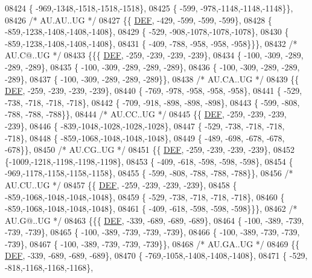 \begin{DoxyCode}
08424 \{ -969,-1348,-1518,-1518,-1518\},
08425 \{ -599, -978,-1148,-1148,-1148\}\},
08426 \textcolor{comment}{/* AU.AU..UG */}
08427 \{\{  \mbox{\hyperlink{1_88_84__epars_8h_a397419fc12b37ed479c8abb9d444d843}{DEF}}, -429, -599, -599, -599\},
08428 \{ -859,-1238,-1408,-1408,-1408\},
08429 \{ -529, -908,-1078,-1078,-1078\},
08430 \{ -859,-1238,-1408,-1408,-1408\},
08431 \{ -409, -788, -958, -958, -958\}\}\},
08432 \textcolor{comment}{/* AU.C@..UG */}
08433 \{\{\{  \mbox{\hyperlink{1_88_84__epars_8h_a397419fc12b37ed479c8abb9d444d843}{DEF}}, -259, -239, -239, -239\},
08434 \{ -100, -309, -289, -289, -289\},
08435 \{ -100, -309, -289, -289, -289\},
08436 \{ -100, -309, -289, -289, -289\},
08437 \{ -100, -309, -289, -289, -289\}\},
08438 \textcolor{comment}{/* AU.CA..UG */}
08439 \{\{  \mbox{\hyperlink{1_88_84__epars_8h_a397419fc12b37ed479c8abb9d444d843}{DEF}}, -259, -239, -239, -239\},
08440 \{ -769, -978, -958, -958, -958\},
08441 \{ -529, -738, -718, -718, -718\},
08442 \{ -709, -918, -898, -898, -898\},
08443 \{ -599, -808, -788, -788, -788\}\},
08444 \textcolor{comment}{/* AU.CC..UG */}
08445 \{\{  \mbox{\hyperlink{1_88_84__epars_8h_a397419fc12b37ed479c8abb9d444d843}{DEF}}, -259, -239, -239, -239\},
08446 \{ -839,-1048,-1028,-1028,-1028\},
08447 \{ -529, -738, -718, -718, -718\},
08448 \{ -859,-1068,-1048,-1048,-1048\},
08449 \{ -489, -698, -678, -678, -678\}\},
08450 \textcolor{comment}{/* AU.CG..UG */}
08451 \{\{  \mbox{\hyperlink{1_88_84__epars_8h_a397419fc12b37ed479c8abb9d444d843}{DEF}}, -259, -239, -239, -239\},
08452 \{-1009,-1218,-1198,-1198,-1198\},
08453 \{ -409, -618, -598, -598, -598\},
08454 \{ -969,-1178,-1158,-1158,-1158\},
08455 \{ -599, -808, -788, -788, -788\}\},
08456 \textcolor{comment}{/* AU.CU..UG */}
08457 \{\{  \mbox{\hyperlink{1_88_84__epars_8h_a397419fc12b37ed479c8abb9d444d843}{DEF}}, -259, -239, -239, -239\},
08458 \{ -859,-1068,-1048,-1048,-1048\},
08459 \{ -529, -738, -718, -718, -718\},
08460 \{ -859,-1068,-1048,-1048,-1048\},
08461 \{ -409, -618, -598, -598, -598\}\}\},
08462 \textcolor{comment}{/* AU.G@..UG */}
08463 \{\{\{  \mbox{\hyperlink{1_88_84__epars_8h_a397419fc12b37ed479c8abb9d444d843}{DEF}}, -339, -689, -689, -689\},
08464 \{ -100, -389, -739, -739, -739\},
08465 \{ -100, -389, -739, -739, -739\},
08466 \{ -100, -389, -739, -739, -739\},
08467 \{ -100, -389, -739, -739, -739\}\},
08468 \textcolor{comment}{/* AU.GA..UG */}
08469 \{\{  \mbox{\hyperlink{1_88_84__epars_8h_a397419fc12b37ed479c8abb9d444d843}{DEF}}, -339, -689, -689, -689\},
08470 \{ -769,-1058,-1408,-1408,-1408\},
08471 \{ -529, -818,-1168,-1168,-1168\},

\end{DoxyCode}
